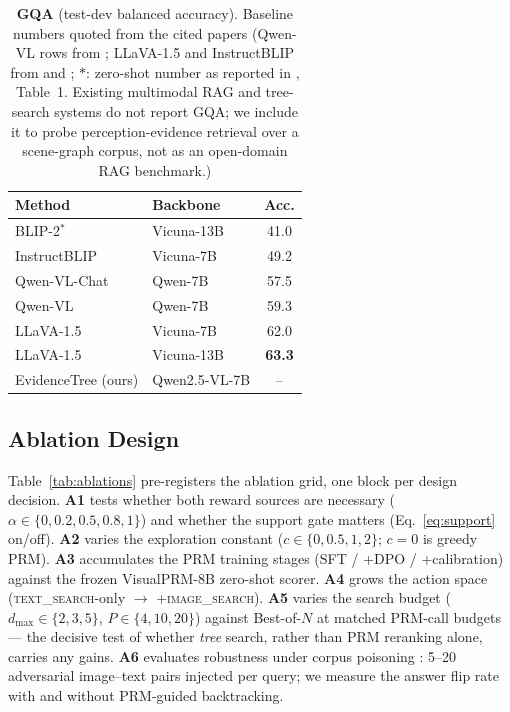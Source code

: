 \documentclass[letterpaper,twocolumn,10pt]{article}
\newcommand{\ours}{EvidenceTree}
\newcommand{\NA}{--}          %
\newcommand{\best}[1]{\textbf{#1}}
\begin{document}
\begin{table}[t]
\centering\small
\setlength{\tabcolsep}{4pt}
\begin{tabular}{@{}llc@{}}
\toprule
Method & Backbone & Acc. \\
\midrule
BLIP-2$^{\ast}$ \cite{li2023blip2} & Vicuna-13B & 41.0 \\
InstructBLIP \cite{dai2023instructblip} & Vicuna-7B & 49.2 \\
Qwen-VL-Chat \cite{bai2023qwenvl} & Qwen-7B & 57.5 \\
Qwen-VL \cite{bai2023qwenvl} & Qwen-7B & 59.3 \\
LLaVA-1.5 \cite{liu2024llava15} & Vicuna-7B & 62.0 \\
LLaVA-1.5 \cite{liu2024llava15} & Vicuna-13B & \best{63.3} \\
\midrule
\ours{} (ours) & Qwen2.5-VL-7B & \NA \\
\bottomrule
\end{tabular}
\caption{\textbf{GQA} (test-dev balanced accuracy). Baseline numbers
quoted from the cited papers (Qwen-VL rows from \citealt{bai2023qwenvl};
LLaVA-1.5 and InstructBLIP from \citealt{liu2024llava15} and
\citealt{dai2023instructblip}; $\ast$: zero-shot number as reported in
\citealt{liu2024llava15}, Table~1. Existing multimodal RAG and tree-search
systems do not report GQA; we include it to probe perception-evidence
retrieval over a scene-graph corpus, not as an open-domain RAG benchmark.)}
\label{tab:gqa}
\end{table}

\subsection{Ablation Design}
\label{sec:ablations}

Table~\ref{tab:ablations} pre-registers the ablation grid, one block per
design decision. \textbf{A1} tests whether both reward sources are
necessary ($\alpha \in \{0, 0.2, 0.5, 0.8, 1\}$) and whether the support
gate matters (Eq.~\ref{eq:support} on/off). \textbf{A2} varies the
exploration constant ($c \in \{0, 0.5, 1, 2\}$; $c{=}0$ is greedy PRM).
\textbf{A3} accumulates the PRM training stages (SFT / +DPO /
+calibration) against the frozen VisualPRM-8B zero-shot scorer.
\textbf{A4} grows the action space (\textsc{text\_search}-only
$\rightarrow$ +\textsc{image\_search}). \textbf{A5} varies the search
budget ($d_{\max} \in \{2,3,5\}$, $P \in \{4,10,20\}$) against
Best-of-$N$ at matched PRM-call budgets --- the decisive test of whether
\emph{tree} search, rather than PRM reranking alone, carries any gains.
\textbf{A6} evaluates robustness under corpus poisoning
\cite{poisonedmrag2025}: 5--20 adversarial image--text pairs injected per
query; we measure the answer flip rate with and without PRM-guided
backtracking.
\end{document}
